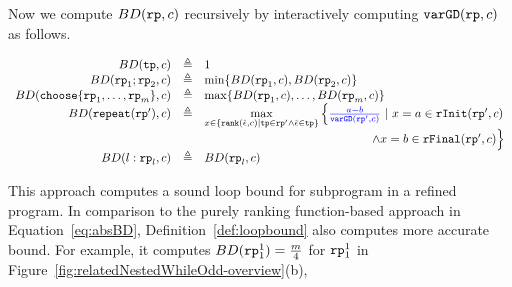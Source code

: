 Now we compute $BD(\mathtt{rp}, c)$ recursively by interactively computing  $\mathtt{varGD}(\mathtt{rp}, c)$  as follows.
\begin{defn}
\label{def:loopbound}
{\small
  \[
    \begin{array}{rcl}
      BD(\tpath, c) & \triangleq & 1 \\
      BD(\rprog_1;\rprog_2, c) & \triangleq & \min \left\{BD(\rprog_1, c), BD(\rprog_2, c) \right\} \\
      BD(\rpchoose{\rprog_1, \ldots, \rprog_m }, c) & \triangleq 
      & \max\left\{ BD(\rprog_1, c), \ldots, BD(\rprog_m, c) \right\} \\
      BD(\rprepeat(\rprog'), c) & \triangleq 
      &
      \max\limits_{x \in \left\{ \locbound(\absevent, c) | \tpath \in \rprog' \land \absevent \in \tpath \right\}}
      \Big\{ \highlight{\frac{a - b}{\varGD(\rprog', c)}} ~\vert~
      x = a \in \rfinit(\rprog', c)
      \\ & & \qquad \qquad \qquad \qquad \qquad \qquad \qquad 
      \land x = b \in \rffinal(\rprog', c)
      \Big\} 
      \\
      BD(l: \rprog_l, c) & \triangleq & BD(\rprog_l, c)
    \end{array}
  \]
}
\end{defn}
This approach computes a sound loop bound for subprogram in a refined program.
In comparison to the purely ranking function-based approach in Equation~\ref{eq:absBD}, Definition~\ref{def:loopbound}
also computes more accurate bound. For example, it computes $BD(\mathtt{rp}_1^1) = \frac{m}{4}$ for $\mathtt{rp}_1^1$ in Figure~\ref{fig:relatedNestedWhileOdd-overview}(b), 


